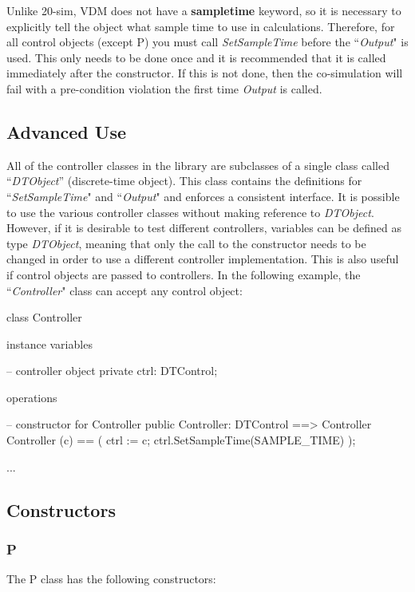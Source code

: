 \documentclass{crescendorepchap}
\begin{document}
Unlike 20-sim, VDM does not have a \textbf{sampletime} keyword, so it is
necessary to explicitly tell the object what sample time to use in
calculations. Therefore, for all control objects (except P) you must
call \emph{SetSampleTime} before the ``\emph{Output}" is used. This only needs
to be done once and it is recommended that it is called immediately
after the constructor. If this is not done, then the co-simulation will fail
with a pre-condition violation the first time \emph{Output} is called.

\subsection{Advanced Use}

All of the controller classes in the library are subclasses of a single
class called ``\emph{DTObject}'' (discrete-time object). This class contains
the definitions for ``\emph{SetSampleTime}" and ``\emph{Output}" and enforces a
consistent interface. It is possible to use the various controller
classes without making reference to \emph{DTObject}. However, if it is
desirable to test different controllers, variables can be defined as
type \emph{DTObject}, meaning that only the call to the constructor
needs to be changed in order to use a different controller
implementation. This is also useful if control objects are passed to
controllers. In the following example, the ``\emph{Controller}" class can
accept any control object:

\begin{vdmrt}
class Controller

instance variables

-- controller object
private ctrl: DTControl;

operations

-- constructor for Controller
public Controller: DTControl ==> Controller
Controller (c) == (
  ctrl := c;
  ctrl.SetSampleTime(SAMPLE_TIME)
);

...
\end{vdmrt}

\subsection{Constructors}

\subsubsection{P}

The P class has the following constructors:
\end{document}
